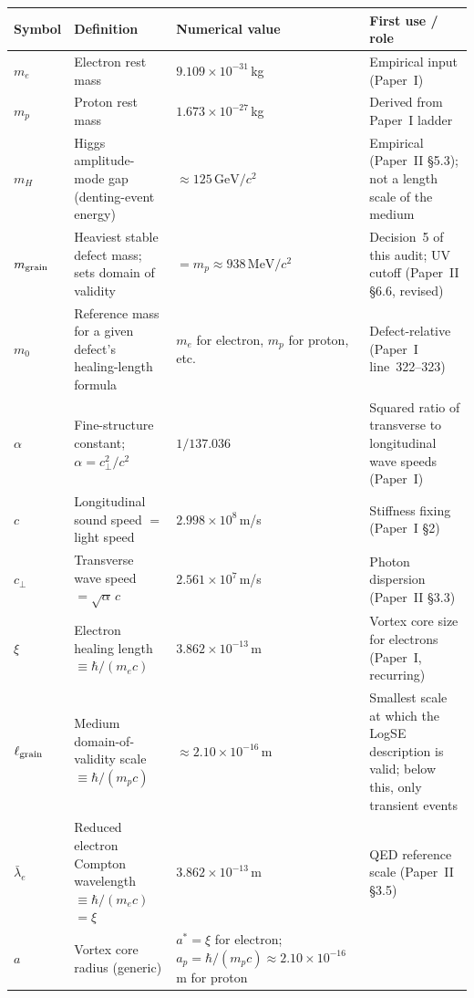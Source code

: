 \documentclass[11pt,a4paper]{article}
\begin{document}
\renewcommand{\arraystretch}{1.6}
\begin{longtable}{@{}p{2.5cm}p{4.5cm}p{3.5cm}p{4cm}@{}}
\toprule
\textbf{Symbol} & \textbf{Definition} & \textbf{Numerical value}
                & \textbf{First use / role} \\
\midrule
\endhead
$m_e$ & Electron rest mass & $9.109\times 10^{-31}$\,kg & 
        Empirical input (Paper~I) \\
$m_p$ & Proton rest mass & $1.673\times 10^{-27}$\,kg & 
        Derived from Paper~I ladder \\
$m_H$ & Higgs amplitude-mode gap (denting-event energy) &
        $\approx 125\,\mathrm{GeV}/c^2$ &
        Empirical (Paper~II \S5.3); not a length scale of the medium \\
$m_{\rm grain}$ & Heaviest stable defect mass; sets domain of validity &
        $= m_p \approx 938\,\mathrm{MeV}/c^2$ &
        Decision~5 of this audit; UV cutoff (Paper~II \S6.6, revised) \\
$m_0$ & Reference mass for a given defect's healing-length formula
        & $m_e$ for electron, $m_p$ for proton, etc. &
        Defect-relative (Paper~I line~322--323) \\
\midrule
$\alpha$ & Fine-structure constant; $\alpha = c_\perp^2/c^2$ & $1/137.036$ &
        Squared ratio of transverse to longitudinal wave speeds (Paper~I) \\
$c$ & Longitudinal sound speed $=$ light speed &
        $2.998\times 10^8$\,m/s & Stiffness fixing (Paper~I \S2) \\
$c_\perp$ & Transverse wave speed $= \sqrt\alpha\,c$ &
        $2.561\times 10^7$\,m/s & Photon dispersion (Paper~II \S3.3) \\
\midrule
$\xi$ & Electron healing length $\equiv \hbar/(m_e c)$ &
        $3.862\times 10^{-13}$\,m & 
        Vortex core size for electrons (Paper~I, recurring) \\
$\ell_{\rm grain}$ & Medium domain-of-validity scale $\equiv \hbar/(m_p c)$ &
        $\approx 2.10\times 10^{-16}\,\mathrm{m}$ & 
        Smallest scale at which the LogSE description is valid; below
        this, only transient events \\
$\bar\lambda_e$ & Reduced electron Compton wavelength $\equiv \hbar/(m_ec)$
                  $= \xi$ &
        $3.862\times 10^{-13}$\,m & QED reference scale (Paper~II \S3.5) \\
$a$ & Vortex core radius (generic) &
        $a^* = \xi$ for electron;
        $a_p = \hbar/(m_p c) \approx 2.10\times 10^{-16}$\,m for proton &

\end{longtable}
\end{document}
